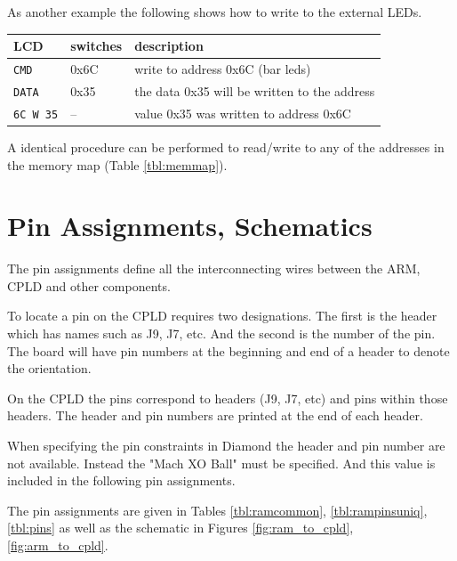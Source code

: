 \documentclass{article}
\begin{document}
As another example the following shows how to write to the external LEDs.

\begin{tabular}{l l l}
LCD & switches & description \\
\hline
\verb+CMD+  & 0x6C & write to address 0x6C (bar leds) \\
\verb+DATA+ & 0x35 & the data 0x35 will be written to the address \\
\verb+6C W 35+ & -- & value 0x35 was written to address 0x6C
\end{tabular}

A identical procedure can be performed to read/write to any
of the addresses in the memory map (Table \ref{tbl:memmap}).


\section{Pin Assignments, Schematics}
\label{sec:pa}

The pin assignments define all the interconnecting wires
between the ARM, CPLD and other components.

To locate a pin on the CPLD requires two designations\citep[Pg. 11-14]{EB66}.
The first is the header which has names such as J9, J7, etc.
And the second is the number of the pin.
The board will have pin numbers at the beginning and end of a header
to denote the orientation.

On the CPLD the pins correspond to headers (J9, J7, etc)
and pins within those headers\citep[Pg. 11-14]{EB66}.
The header and pin numbers are printed at the end of each header.

When specifying the pin constraints in Diamond\cite{Diamond}
the header and pin number are not available.
Instead the "Mach XO Ball" must be specified.
And this value is included in the following pin assignments.

The pin assignments are given in Tables
\ref{tbl:ramcommon}, \ref{tbl:rampinsuniq}, \ref{tbl:pins}
as well as the schematic in Figures \ref{fig:ram_to_cpld}, \ref{fig:arm_to_cpld}.
\end{document}
